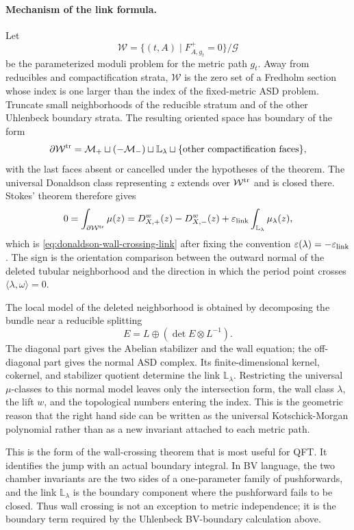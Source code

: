 \paragraph{Mechanism of the link formula.}
Let
\[
  \mathcal W
  =
  \{(t,A)\mid F_{A,g_t}^+=0\}/\mathcal G
\]
be the parameterized moduli problem for the metric path \(g_t\).  Away from
reducibles and compactification strata, \(\mathcal W\) is the zero set of a
Fredholm section whose index is one larger than the index of the fixed-metric
ASD problem.  Truncate small neighborhoods of the reducible stratum and of the
other Uhlenbeck boundary strata.  The resulting oriented space has boundary
of the form
\begin{equation}
  \partial\mathcal W^{\rm tr}
  =
  \mathcal M_{+}
  \sqcup
  (-\mathcal M_{-})
  \sqcup
  \mathbb L_\lambda
  \sqcup
  \{\text{other compactification faces}\},
  \label{eq:parameterized-wall-crossing-boundary}
\end{equation}
with the last faces absent or cancelled under the hypotheses of the theorem.
The universal Donaldson class representing \(z\) extends over
\(\mathcal W^{\rm tr}\) and is closed there.  Stokes' theorem therefore gives
\[
  0
  =
  \int_{\partial\mathcal W^{\rm tr}}\mu(z)
  =
  D_{X,+}^w(z)-D_{X,-}^w(z)
  +\varepsilon_{\rm link}\int_{\mathbb L_\lambda}\mu_\lambda(z),
\]
which is \eqref{eq:donaldson-wall-crossing-link} after fixing the convention
\(\varepsilon(\lambda)=-\varepsilon_{\rm link}\).  The sign is the orientation
comparison between the outward normal of the deleted tubular neighborhood and
the direction in which the period point crosses
\(\langle\lambda,\omega\rangle=0\).

The local model of the deleted neighborhood is obtained by decomposing the
bundle near a reducible splitting
\[
  E=L\oplus(\det E\otimes L^{-1}).
\]
The diagonal part gives the Abelian stabilizer and the wall equation; the
off-diagonal part gives the normal ASD complex.  Its finite-dimensional
kernel, cokernel, and stabilizer quotient determine the link
\(\mathbb L_\lambda\).  Restricting the universal \(\mu\)-classes to this
normal model leaves only the intersection form, the wall class \(\lambda\), the
lift \(w\), and the topological numbers entering the index.  This is the
geometric reason that the right hand side can be written as the universal
Kotschick-Morgan polynomial rather than as a new invariant attached to each
metric path.

This is the form of the wall-crossing theorem that is most useful for QFT.
It identifies the jump with an actual boundary integral.  In BV language, the
two chamber invariants are the two sides of a one-parameter family of
pushforwards, and the link \(\mathbb L_\lambda\) is the boundary component
where the pushforward fails to be closed.  Thus wall crossing is not an
exception to metric independence; it is the boundary term required by
the Uhlenbeck BV-boundary calculation above.


